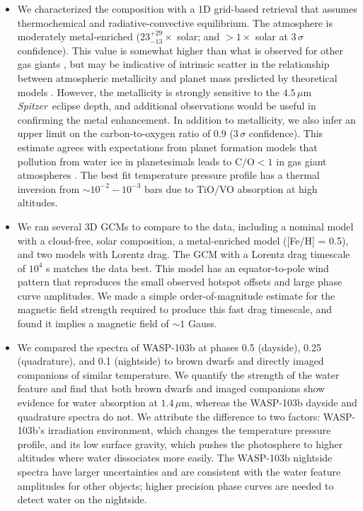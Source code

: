 \documentclass[twocolumn, trackchanges]{aastex61}
\newcommand{\project}[1]{\textsl{#1}}
\newcommand{\Spitzer}{\project{Spitzer}}
\begin{document}
\begin{itemize}
	\item{We characterized the composition with a 1D grid-based retrieval that assumes thermochemical and radiative-convective equilibrium. The atmosphere is moderately metal-enriched ($23^{+29}_{-13}\times$ solar; and $>1\times$ solar at $3\,\sigma$ confidence). This value is somewhat higher than what is observed for other gas giants \citep[e.g.][]{wong04, kreidberg14b}, but may be indicative of intrinsic scatter in the relationship between atmospheric metallicity and planet mass predicted by theoretical models \citep{fortney13, mordasini16}. However, the metallicity is strongly sensitive to the $4.5\,\mu$m \Spitzer\ eclipse depth, and additional observations would be useful in confirming the metal enhancement.  In addition to metallicity, we also infer an upper limit on the carbon-to-oxygen ratio of 0.9 ($3\,\sigma$ confidence). This estimate agrees with expectations from planet formation models that pollution from water ice in planetesimals leads to $\mathrm{C/O} < 1$ in gas giant atmospheres \citep{mordasini16, espinoza17}. The best fit temperature pressure profile has a thermal inversion from $\sim10^{-2} - 10^{-3}$ bars due to TiO/VO absorption at high altitudes.} 
	\item{We ran several 3D GCMs to compare to the data, including a nominal model with a cloud-free, solar composition, a metal-enriched model ([Fe/H] = 0.5), and two models with Lorentz drag. The GCM with a Lorentz drag timescale of $10^4$ s matches the data best. This model has an equator-to-pole wind pattern that reproduces the small observed hotspot offsets and large phase curve amplitudes. We made a simple order-of-magnitude estimate for the magnetic field strength required to produce this fast drag timescale, and found it implies a magnetic field of $\sim1$ Gauss.}
	\item{We compared the spectra of WASP-103b at phases 0.5 (dayside), 0.25 (quadrature), and 0.1 (nightside) to brown dwarfs and directly imaged companions of similar temperature. We quantify the strength of the water feature and find that both brown dwarfs and imaged companions show evidence for water absorption at $1.4\,\mu$m, whereas the WASP-103b dayside and quadrature spectra do not. We attribute the difference to two factors: WASP-103b's irradiation environment, which changes the temperature pressure profile, and its low surface gravity, which pushes the photosphere to higher altitudes where water dissociates more easily. The WASP-103b nightside spectra have larger uncertainties and are consistent with the water feature amplitudes for other objects; higher precision phase curves are needed to detect water on the nightside.}
\end{itemize}
\end{document}
